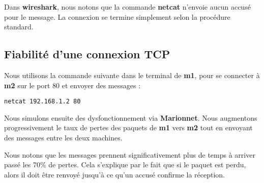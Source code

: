 \documentclass{article}
\begin{document}
Dans \textbf{wireshark}, nous notons que la commande \textbf{netcat} n'envoie aucun accusé pour le message. La connexion se termine simplement selon la procédure standard.

\subsection{Fiabilité d'une connexion TCP}

Nous utilisons la commande suivante dans le terminal de \textbf{m1}, pour se connecter à \textbf{m2} sur le port 80 et envoyer des messages :
\begin{verbatim}
netcat 192.168.1.2 80
\end{verbatim}

Nous simulons ensuite des dysfonctionnement via \textbf{Marionnet}. Nous augmentons progressivement le taux de pertes des paquets de \textbf{m1} vers \textbf{m2} tout en envoyant des messages entre les deux machines.

Nous notons que les messages prennent significativement plus de temps à arriver passé les 70\% de pertes. Cela s'explique par le fait que si le paquet est perdu, alors il doit être renvoyé jusqu'à ce qu'un accusé confirme la réception.
\end{document}

